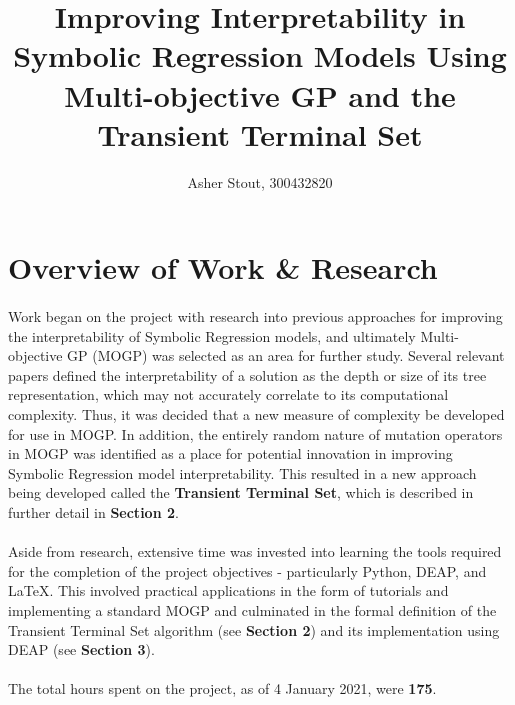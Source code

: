 \documentclass[a4paper]{article}
\title{Improving Interpretability in Symbolic Regression Models Using Multi-objective GP and the Transient Terminal Set}
\author{Asher Stout, 300432820}
\begin{document}
\maketitle

\section{Overview of Work \& Research}
\paragraph{} Work began on the project with research into previous approaches for improving the interpretability of Symbolic Regression models, and ultimately Multi-objective GP (MOGP) was selected as an area for further study. Several relevant papers defined the interpretability of a solution as the depth or size of its tree representation, which may not accurately correlate to its computational complexity. Thus, it was decided that a new measure of complexity be developed for use in MOGP. In addition, the entirely random nature of mutation operators in MOGP was identified as a place for potential innovation in improving Symbolic Regression model interpretability. This resulted in a new approach being developed called the \textbf{Transient Terminal Set}, which is described in further detail in \textbf{Section 2}.
\paragraph{} Aside from research, extensive time was invested into learning the tools required for the completion of the project objectives - particularly Python, DEAP, and LaTeX. This involved practical applications in the form of tutorials and implementing a standard MOGP and culminated in the formal definition of the Transient Terminal Set algorithm (see \textbf{Section 2}) and its implementation using DEAP (see \textbf{Section 3}). 
\paragraph{}The total hours spent on the project, as of 4 January 2021, were \textbf{175}.

\end{document}
